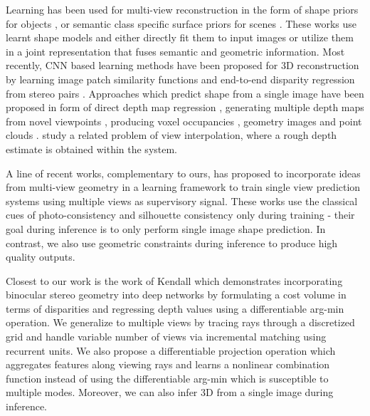 \documentclass[../thesis.tex]{subfiles}
\begin{document}
Learning has been used for multi-view reconstruction in the form of shape priors for objects \cite{blanz1999morphable,dame2013dense,yingze2013dense,hane2014class,kar2015category,pamishapeTulsianiKCM15}, or semantic class specific surface priors for scenes \cite{hane2013joint,haene2016dense,savinov2016semantic}. These works use learnt shape models and either directly fit them to input images or utilize them in a joint representation that fuses semantic and geometric information.
Most recently, CNN based learning methods have been proposed for 3D reconstruction by learning image patch similarity functions \cite{zbontar2016stereo,Han_2015_CVPR,hartmann2017multi} and end-to-end disparity regression from stereo pairs \cite{mayer2016large,kendall2017end}. 
Approaches which predict shape from a single image have been proposed in form of direct depth map regression \cite{saxena2007depth,ladicky2014pulling,eigen2014depth}, generating multiple depth maps from novel viewpoints \cite{tatarchenko2016multi}, producing voxel occupancies \cite{choy20163d,girdhar2016learning}, geometry images \cite{sinha2016deep} and point clouds \cite{fan2016point}. \cite{flynn2016deepstereo} study a related problem of view interpolation, where a rough depth estimate is obtained within the system.  

A line of recent works, complementary to ours, has proposed to incorporate ideas from multi-view geometry in a learning framework to train single view prediction systems \cite{garg2016unsupervised,yan2016perspective,tulsiani2017multi,rezende2016unsupervised,zhou2017unsupervised} using multiple views as supervisory signal. These works use the classical cues of photo-consistency and silhouette consistency only during training - their goal during inference is to only perform single image shape prediction. In contrast, we also use geometric constraints during inference to produce high quality outputs.

Closest to our work is the work of Kendall \etal \cite{kendall2017end} which demonstrates incorporating binocular stereo geometry into deep networks by formulating a cost volume in terms of disparities and regressing depth values using a differentiable arg-min operation. We generalize to multiple views by tracing rays through a discretized grid and handle variable number of views via incremental matching using recurrent units. We also propose a differentiable projection operation which aggregates features along viewing rays and learns a nonlinear combination function instead of using the differentiable arg-min which is susceptible to multiple modes. Moreover, we can also infer 3D from a single image during inference.
\end{document}
